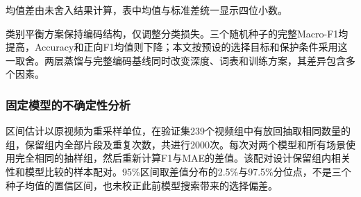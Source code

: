 均值差由未舍入结果计算，表中均值与标准差统一显示四位小数。

类别平衡方案保持编码结构，仅调整分类损失。三个随机种子的完整Macro-F1均提高，Accuracy和正向F1均值则下降；本文按预设的选择目标和保护条件采用这一取舍。两层蒸馏与完整编码基线同时改变深度、词表和训练方案，其差异包含多个因素。

\hypertarget{q2-ux56faux5b9aux6a21ux578bux7684ux4e0dux786eux5b9aux6027ux5206ux6790}{%
\subsubsection{固定模型的不确定性分析}\label{q2-ux56faux5b9aux6a21ux578bux7684ux4e0dux786eux5b9aux6027ux5206ux6790}}

区间估计以原视频为重采样单位，在验证集239个视频组中有放回抽取相同数量的组，保留组内全部片段及重复次数，共进行2000次。每次对两个模型和所有场景使用完全相同的抽样组，然后重新计算F1与MAE的差值。该配对设计保留组内相关性和模型比较的样本配对。95\%区间取差值分布的2.5\%与97.5\%分位点，不是三个种子均值的置信区间，也未校正此前模型搜索带来的选择偏差。

